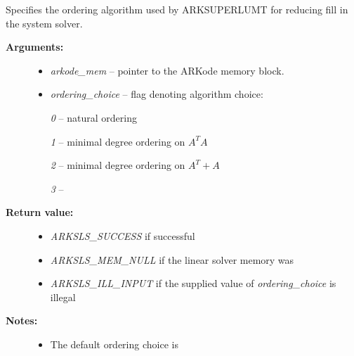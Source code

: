 \documentclass[letterpaper,10pt,english]{sphinxmanual}
\begin{document}
\begin{fulllineitems}
\label{c_interface/User_callable:c.ARKSuperLUMTSetOrdering}
Specifies the ordering algorithm used by ARKSUPERLUMT for reducing
fill in the system solver.
\begin{description}
\item[{\textbf{Arguments:}}] \leavevmode\begin{itemize}
\item {} 
\emph{arkode\_mem} -- pointer to the ARKode memory block.

\item {} 
\emph{ordering\_choice} -- flag denoting algorithm choice:

\emph{0} -- natural ordering

\emph{1} -- minimal degree ordering on \(A^TA\)

\emph{2} -- minimal degree ordering on \(A^T + A\)

\emph{3} -- 

\end{itemize}

\item[{\textbf{Return value:}}] \leavevmode\begin{itemize}
\item {} 
\emph{ARKSLS\_SUCCESS}  if successful

\item {} 
\emph{ARKSLS\_MEM\_NULL} if the linear solver memory was 

\item {} 
\emph{ARKSLS\_ILL\_INPUT} if the supplied value of \emph{ordering\_choice} is illegal

\end{itemize}

\item[{\textbf{Notes:}}] \leavevmode\begin{itemize}
\item {} 
The default ordering choice is 

\end{itemize}

\end{description}

\end{fulllineitems}

\end{document}
